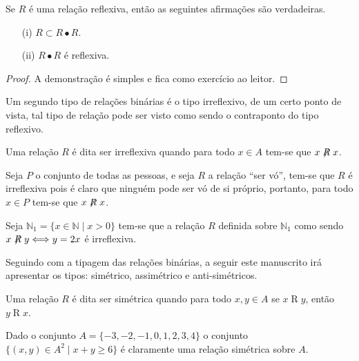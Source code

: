 \begin{theorem}
	Se $R$ é uma relação reflexiva, então as seguintes afirmações são verdadeiras.
	\begin{itemize}
		\item[(i)] $R \subset R \bullet R$.
		\item[(ii)] $R \bullet R$ é reflexiva.
	\end{itemize}
\end{theorem}

\begin{proof}
	A demonstração é simples e fica como exercício ao leitor.
\end{proof}

Um segundo tipo de relações binárias é o tipo irreflexivo, de um certo ponto de vista, tal tipo de relação pode ser visto como sendo o contraponto do tipo reflexivo.

\begin{definition}\label{def:RelacaoIrreflexiva}
	Uma relação $R$ é dita ser irreflexiva quando para todo $x \in A$ tem-se que $x \centernot{R} x$.
\end{definition}

\begin{example}
	Seja $P$ o conjunto de todas as pessoas, e seja $R$ a relação ``ser vó'', tem-se que $R$ é irreflexiva pois é claro que ninguém pode ser vó de si próprio, portanto, para todo $x \in P$ tem-se que $x \centernot{R} x$.
\end{example}

\begin{example}
	Seja $\mathbb{N}_1 = \{x \in \mathbb{N} \mid x > 0\}$ tem-se que a relação $R$ definida sobre $\mathbb{N}_1$ como sendo $x \centernot{R} y \Longleftrightarrow y = 2x$ é irreflexiva.
\end{example}

Seguindo com a tipagem das relações binárias,  a seguir este manuscrito irá apresentar os tipos: simétrico, assimétrico e anti-simétricos.

\begin{definition}\label{def:RelacaoSimétrica}
	Uma relação $R$ é dita ser simétrica quando para todo $x, y \in A$ se $x \mathrel{R} y$, então $y \mathrel{R} x$.
\end{definition}

\begin{example}
	Dado o conjunto $A = \{-3, -2, -1, 0, 1, 2, 3, 4\}$ o conjunto $\{(x, y) \in A^2 \mid x + y \geq 6\}$ é claramente uma relação simétrica sobre $A$.
\end{example}

